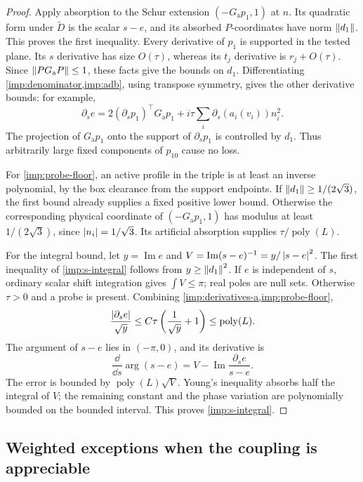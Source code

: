 \begin{proof}
Apply absorption to the Schur extension
$(-G_{\mathrm a}p_1,1)$ at $n$. Its quadratic form under $\widetilde D$
is the scalar $s-e$, and its absorbed $P$-coordinates have norm
$\left\lVert d_1\right\rVert$. This proves the first inequality. Every derivative of
$p_1$ is supported in the tested plane. Its $s$ derivative has size
$O(\tau)$, whereas its $t_j$ derivative is $r_j+O(\tau)$. Since
$\left\lVert PG_{\mathrm a}P\right\rVert\le1$, these facts give the bounds on $d_1$.
Differentiating \cref{imp:denominator,imp:adb}, using transpose symmetry,
gives the other derivative bounds: for example,
\[
 \partial_s e
 =2(\partial_s p_1)^\top G_{\mathrm a}p_1
   +i\tau\sum_i\partial_s(a_i(v_i))n_i^2.
\]
The projection of $G_{\mathrm a}p_1$ onto the support of
$\partial_s p_1$ is controlled by $d_1$. Thus arbitrarily large fixed
components of $p_{10}$ cause no loss.

For \cref{imp:probe-floor}, an active profile in the triple is at least
an inverse polynomial, by the box clearance from the support endpoints.
If $\left\lVert d_1\right\rVert\ge1/(2\sqrt3)$, the first bound already supplies a fixed
positive lower bound. Otherwise the corresponding physical coordinate
of $(-G_{\mathrm a}p_1,1)$ has modulus at least $1/(2\sqrt3)$, since
$\left\lvert n_i\right\rvert=1/\sqrt3$. Its artificial absorption supplies
$\tau/\operatorname{poly}(L)$.

For the integral bound, let $y=\operatorname{Im}e$ and
$V=\operatorname{Im}(s-e)^{-1}=y/\left\lvert s-e\right\rvert^2$. The first inequality
of \cref{imp:s-integral} follows from $y\ge\left\lVert d_1\right\rVert^2$. If $e$ is
independent of $s$, ordinary scalar shift integration gives
$\int V\le\pi$; real poles are null sets. Otherwise $\tau>0$ and a
probe is present. Combining \cref{imp:derivatives-a,imp:probe-floor},
\[
 \frac{\left\lvert\partial_s e\right\rvert}{\sqrt y}
 \le C\tau\left(\frac1{\sqrt y}+1\right)
 \le\operatorname{poly}(L).
\]
The argument of $s-e$ lies in $(-\pi,0)$, and its derivative is
\[
 \frac{\dd}{\dd s}\arg(s-e)
 =V-\operatorname{Im}\frac{\partial_s e}{s-e}.
\]
The error is bounded by $\operatorname{poly}(L)\sqrt V$. Young's
inequality absorbs half the integral of $V$; the remaining constant and
the phase variation are polynomially bounded on the bounded interval.
This proves \cref{imp:s-integral}.
\end{proof}

\subsection{Weighted exceptions when the coupling is appreciable}

